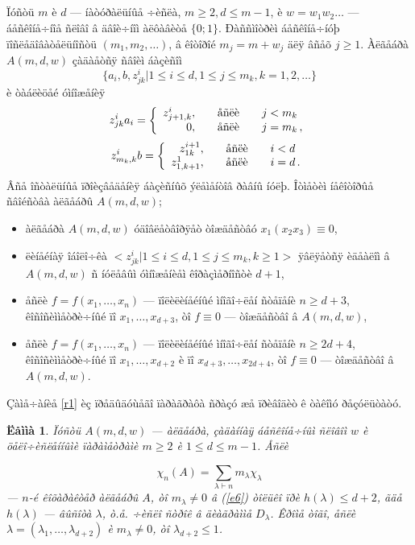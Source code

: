 \documentclass{article}
\numberwithin{equation}{section}
\theoremstyle{plain}
\newtheorem{lemma}{Ëåììà}[section]
\theoremstyle{definition}
\begin{document}
\begin{fulltext}
\subsection{}\label{s3.1}
Ïóñòü $m$ è $d$ --- íàòóðàëüíûå ÷èñëà, $m\ge 2, d\le m-1$, è $w=w_1 w_2\ldots$ --- 
áåñêîíå÷íîå ñëîâî â äâîè÷íîì àëôàâèòå $\{0;1\}$. Ðàññìîòðèì áåñêîíå÷íóþ
ïîñëåäîâàòåëüíîñòü $(m_1,m_2,\ldots)$, â êîòîðîé $m_j=m+w_j$ äëÿ âñåõ $j\ge 1$. 
Àëãåáðà $A(m,d,w)$ çàäàåòñÿ ñâîèì áàçèñîì
$$
\{ a_i, b, z_{jk}^i|1\le i \le d, 1\le j \le m_k, k=1,2,\ldots\}
$$
è òàáëèöåé óìíîæåíèÿ
$$
z^i_{jk} a_i=
\left\{
  \begin{array}{rcl}
     z^i_{j+1,k}, &\quad \hbox{åñëè} \quad & j<m_k  \\
    0, &\quad \hbox{åñëè} \quad & j=m_k\, ,
           \end{array}
\right.
$$ 
$$
z^i_{m_k,k} b=
\left\{
  \begin{array}{rcl}
     z^{i+1}_{1k}, &\quad \hbox{åñëè} \quad & i<d  \\
    z_{1,k+1}^1, &\quad \hbox{åñëè} \quad & i=d\, .
           \end{array}
\right.
$$ 
Âñå îñòàëüíûå ïðîèçâåäåíèÿ áàçèñíûõ ýëåìåíòîâ ðàâíû íóëþ. Îòìåòèì íåêîòîðûå ñâîéñòâà àëãåáðû
$A(m,d,w)$;
\begin{itemize}
\item
àëãåáðà $A(m,d,w)$ óäîâëåòâîðÿåò òîæäåñòâó $x_1(x_2x_3)\equiv 0$,
\item
ëèíåéíàÿ îáîëî÷êà $<z^i_{jk}|1\le i\le d, 1\le j \le m_k, k \ge 1 >$ ÿâëÿåòñÿ èäåàëîì â
$A(m,d,w)$ ñ íóëåâûì óìíîæåíèåì êîðàçìåðíîñòè $d+1$,
\item
åñëè $f=f(x_1,\ldots, x_n)$ --- ïîëèëèíåéíûé ìíîãî÷ëåí ñòåïåíè $n\ge d+3$, êîñîñèììåòðè÷íûé 
ïî $x_1,\ldots, x_{d+3}$, òî $f\equiv 0$ --- òîæäåñòâî â $A(m,d,w)$,
\item
åñëè $f=f(x_1,\ldots, x_n)$ --- ïîëèëèíåéíûé ìíîãî÷ëåí ñòåïåíè $n\ge 2d+4$, êîñîñèììåòðè÷íûé 
ïî $x_1,\ldots, x_{d+2}$ è ïî $x_{d+3},\ldots, x_{2d+4}$, òî $f\equiv 0$ --- òîæäåñòâî 
â $A(m,d,w)$.
\end{itemize}

Çàìå÷àíèå \ref{r1} èç ïðåäûäóùåãî ïàðàãðàôà ñðàçó æå ïðèâîäèò ê òàêîìó ðåçóëüòàòó.

\begin{lemma}\label{L4}
Ïóñòü $A(m,d,w)$ --- àëãåáðà, çàäàííàÿ áåñêîíå÷íûì ñëîâîì $w$ è öåëî÷èñëåííûìè ïàðàìåòðàìè
$m\ge 2$ è $1\le d \le m-1$. Åñëè

\begin{equation}\label{e6}
\chi_n(A)=\sum_{\lambda\vdash n} m_\lambda \chi_\lambda
\end{equation}
--- $n$-é êîõàðàêòåð àëãåáðû $A$, òî $m_\lambda\ne 0$ â (\ref{e6}) òîëüêî ïðè 
$h(\lambda)\le d+2$, ãäå $h(\lambda)$ --- âûñîòà $\lambda$, ò.å. ÷èñëî ñòðîê â äèàãðàììå
$D_\lambda$. Êðîìå òîãî, åñëè $\lambda=(\lambda_1,\ldots,\lambda_{d+2})$ è $m_\lambda\ne 0$,
òî $\lambda_{d+2}\le 1$.
\end{lemma}


\end{fulltext}
\end{document}

